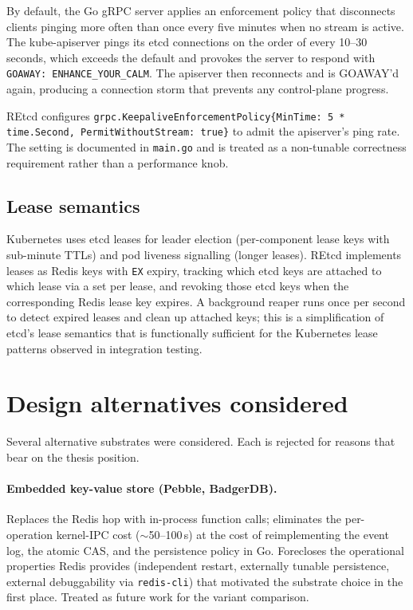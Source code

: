 By default, the Go gRPC server applies an enforcement policy that disconnects clients pinging more often than once every five minutes when no stream is active. The kube-apiserver pings its etcd connections on the order of every 10--30 seconds, which exceeds the default and provokes the server to respond with \texttt{GOAWAY: ENHANCE\_YOUR\_CALM}. The apiserver then reconnects and is GOAWAY'd again, producing a connection storm that prevents any control-plane progress.

REtcd configures \texttt{grpc.KeepaliveEnforcementPolicy\{MinTime: 5 * time.Second, PermitWithoutStream: true\}} to admit the apiserver's ping rate. The setting is documented in \texttt{main.go} and is treated as a non-tunable correctness requirement rather than a performance knob.

\subsection{Lease semantics}
\label{sec:design-k8s-leases}

Kubernetes uses etcd leases for leader election (per-component lease keys with sub-minute TTLs) and pod liveness signalling (longer leases). REtcd implements leases as Redis keys with \texttt{EX} expiry, tracking which etcd keys are attached to which lease via a set per lease, and revoking those etcd keys when the corresponding Redis lease key expires. A background reaper runs once per second to detect expired leases and clean up attached keys; this is a simplification of etcd's lease semantics that is functionally sufficient for the Kubernetes lease patterns observed in integration testing.

\section{Design alternatives considered}
\label{sec:design-alternatives}

Several alternative substrates were considered. Each is rejected for reasons that bear on the thesis position.

\paragraph{Embedded key-value store (Pebble, BadgerDB).}
Replaces the Redis hop with in-process function calls; eliminates the per-operation kernel-IPC cost ($\sim$50--100\,\textmu{}s) at the cost of reimplementing the event log, the atomic CAS, and the persistence policy in Go. Forecloses the operational properties Redis provides (independent restart, externally tunable persistence, external debuggability via \texttt{redis-cli}) that motivated the substrate choice in the first place. Treated as future work for the variant comparison.

